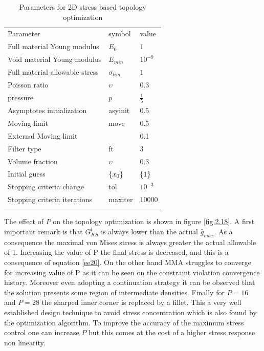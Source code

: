\begin{table}[h!]
                        \caption{Parameters for 2D stress based topology optimization}
                        \label{tab:2.2}       %
                        \centering
                        \begin{tabular}{lll}
                        \hline\noalign{\smallskip}
                        Parameter & symbol & value\\
                        \noalign{\smallskip}\hline\noalign{\smallskip}
           
                        Full material Young modulus & $E_0$ & $1$\\
                        Void material Young modulus & $E_{min}$ & $10^{-9}$ \\
                        Full material allowable stress & $\sigma_{lim}$ & $1$ \\
                        Poisson ratio & $\upsilon$ & $0.3$\\
                        pressure & $p$ & $\frac{1}{5}$\\
                        Asymptotes initialization & asyinit & $0.5$\\
                        Moving limit & move & 0.5\\
                        External Moving limit \cite{verbart2017unified}  &   & 0.1\\
                        Filter type & ft & 3\\
                        Volume fraction & $\upsilon$ & 0.3\\
                        Initial guess & $\left\lbrace{x_0}\right \rbrace$ & $\left\lbrace{1}\right \rbrace$
                       \\ Stopping criteria change & tol & $10^{-3}$\\
                        Stopping criteria iterations & maxiter& $10000$\\
                        \noalign{\smallskip}\hline
                        \end{tabular}
                        \end{table} 
The effect of $P$ on the topology optimization is shown in figure \ref{fig.2.18}. A first important remark is that $G_{KS}^l$ is always lower than the actual $\bar{g}_{max}$. As a consequence the maximal von Mises stress is always greater the actual allowable of 1. Increasing the value of P the final stress is decreased, and this is a consequence of equation \ref{ee20}. On the other hand MMA struggles to converge for increasing value of P as it can be seen on the constraint violation convergence history. Moreover even adopting a continuation strategy it can be observed that the solution presents some region of intermediate densities. Finally for $P=16$ and $P=28$ the sharped inner corner is replaced by a fillet. This a very well established design technique to avoid stress concentration which is also found by the optimization algorithm. To improve the accuracy of the maximum stress control one can increase $P$ but this comes at the cost of a higher stress response non linearity.
